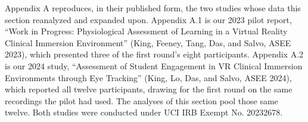 %

Appendix A reproduces, in their published form, the two studies whose data this section
reanalyzed and expanded upon. Appendix A.1 is our 2023 pilot report, ``Work in Progress:
Physiological Assessment of Learning in a Virtual Reality Clinical Immersion Environment''
(King, Feeney, Tang, Das, and Salvo, ASEE 2023), which presented three of the first round's
eight participants. Appendix A.2 is our 2024 study, ``Assessment of Student Engagement in VR
Clinical Immersion Environments through Eye Tracking'' (King, Lo, Das, and Salvo, ASEE 2024),
which reported all twelve participants, drawing for the first round on the same recordings
the pilot had used. The analyses of this section pool those same twelve. Both studies were
conducted under UCI IRB Exempt No. 20232678.


